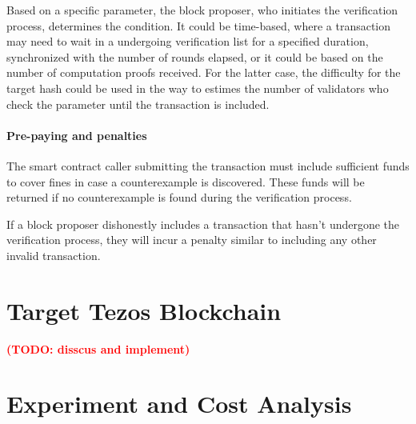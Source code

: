 \documentclass[runningheads]{llncs}
\newcommand{\todo}[1]{\textbf{\textcolor{red}{(TODO: #1)}}}
\begin{document}
Based on a specific parameter, the block proposer, who initiates the verification process, determines the condition. It could be time-based, where a transaction may need to wait in a undergoing verification list for a specified duration, synchronized with the number of rounds elapsed, or it could be based on the number of computation proofs received. For the latter case,  the difficulty for the target hash could be used in the way to estimes the number of validators who check the parameter until the transaction is included.

\paragraph{Pre-paying and penalties} The smart contract caller submitting the transaction must include sufficient funds to cover fines in case a counterexample is discovered. These funds will be returned if no counterexample is found during the verification process.

If a block proposer dishonestly includes a transaction that hasn't undergone the verification process, they will incur a penalty similar to including any other invalid transaction.

\section{Target Tezos Blockchain}
\label{sec:tezos}

\todo{disscus and implement}



\section{Experiment and Cost Analysis}
\label{sec:cost-analysis}
\end{document}
